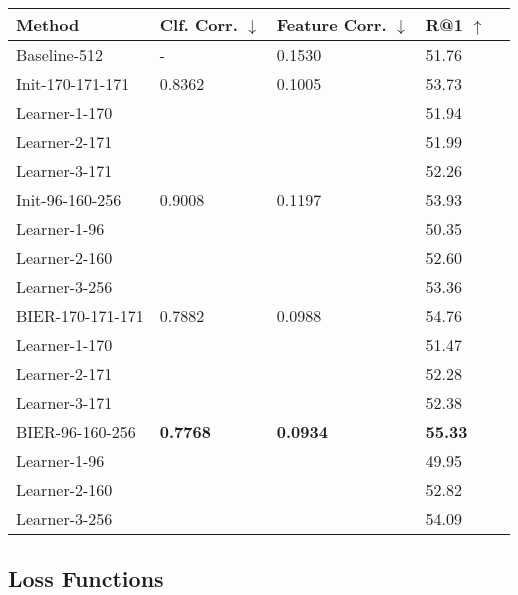 \documentclass[10pt,journal,compsoc]{IEEEtran}
\begin{document}
\begin{table}[htbp]
\begin{tabular}{lllll}
\hline
Method                                  & Clf. Corr. $\downarrow$ & Feature Corr. $\downarrow$ & R@1 $\uparrow$ \\
\hline
Baseline-512                            & -                & 0.1530            & 51.76  \\
\hline
Init-170-171-171                        & 0.8362           & 0.1005              & 53.73 \\ 
\hspace{2mm}  Learner-1-170      &                  &                     & 51.94 \\
\hspace{2mm}  Learner-2-171      &                  &                     & 51.99 \\
\hspace{2mm}  Learner-3-171      &                  &                     & 52.26 \\
\hline
Init-96-160-256                         & 0.9008           & 0.1197           & 53.93 \\
\hspace{2mm}  Learner-1-96       &                  &                     & 50.35 \\
\hspace{2mm}  Learner-2-160      &                  &                     & 52.60 \\
\hspace{2mm}  Learner-3-256      &                  &                     & 53.36 \\
\hline
BIER-170-171-171                        & 0.7882           & 0.0988           & 54.76 \\
\hspace{2mm}  Learner-1-170      &                  &                     & 51.47 \\
\hspace{2mm}  Learner-2-171      &                  &                     & 52.28 \\
\hspace{2mm}  Learner-3-171      &                  &                     & 52.38 \\
\hline
BIER-96-160-256                  & \textbf{0.7768}  & \textbf{0.0934}     & \textbf{55.33}  \\
\hspace{2mm}  Learner-1-96       &                  &                     & 49.95 \\
\hspace{2mm}  Learner-2-160      &                  &                     & 52.82 \\
\hspace{2mm}  Learner-3-256      &                  &                     & 54.09 \\
\hline
\end{tabular}
\end{table}\subsection{Loss Functions}\label{sec:eval-loss-functions}
\end{document}
